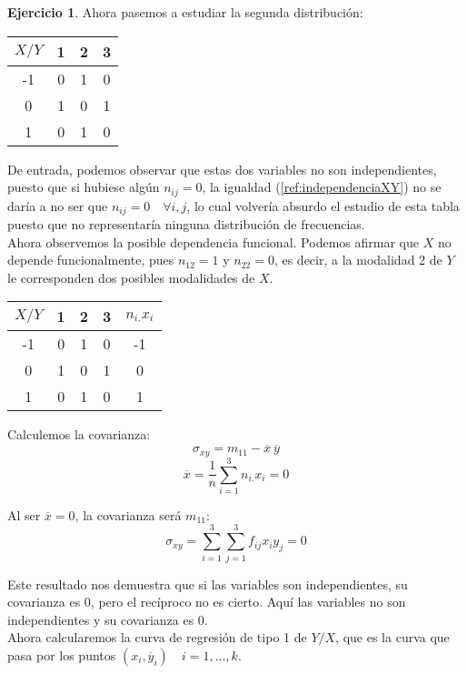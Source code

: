 \documentclass[a4paper, 12pt]{article}
\theoremstyle{definition}
\newtheorem{ej}{Ejercicio}
\begin{document}
\begin{ej}
\par 

Ahora pasemos a estudiar la segunda distribución:
\begin{center}
\begin{tabular}{c|ccc}
	\(X/Y\) & 1 & 2 & 3 \\
	\hline
	-1 & 0 & 1 & 0 \\
	0 & 1 & 0 & 1 \\
	1 & 0 & 1 & 0
\end{tabular}
\end{center}

De entrada, podemos observar que estas dos variables no son independientes, puesto que si hubiese algún \(n_{ij} = 0\), la igualdad (\ref{ref:independenciaXY}) no se daría a no ser que \(n_{ij} = 0 \quad \forall i,j\), lo cual volvería absurdo el estudio de esta tabla puesto que no representaría ninguna distribución de frecuencias. \\

Ahora observemos la posible dependencia funcional. Podemos afirmar que \(X\) no depende funcionalmente, pues \(n_{12} = 1\) y \(n_{22} = 0\), es decir, a la modalidad 2 de \(Y\) le corresponden dos posibles modalidades de \(X\). \\

\begin{center}
\begin{tabular}{c|cccc}
	\(X/Y\) & 1 & 2 & 3 & \(n_{i.} x_i\) \\
	\hline
	-1 & 0 & 1 & 0 & -1 \\
	0 & 1 & 0 & 1 & 0 \\
	1 & 0 & 1 & 0 & 1
\end{tabular}
\end{center}

Calculemos la covarianza:
\[
	\sigma_{xy} = m_{11} - \overline{x}\ \overline{y}
\]
\[
	\overline{x} = \frac{1}{n} \sum_{i=1}^{3} n_{i.} x_i = 0
\]

Al ser \(\overline{x} = 0\), la covarianza será \(m_{11}\):
\[
	\sigma_{xy} = \sum_{i=1}^{3} \sum_{j=1}^{3} f_{ij} x_i y_j = 0
\]

Este resultado nos demuestra que si las variables son independientes, su covarianza es 0, pero el recíproco no es cierto. Aquí las variables no son independientes y su covarianza es 0. \\

Ahora calcularemos la curva de regresión de tipo 1 de \(Y/X\), que es la curva que pasa por los puntos \((x_i, \overline{y}_i) \quad i=1, \dotsc, k\). \\


\end{ej}
\end{document}
